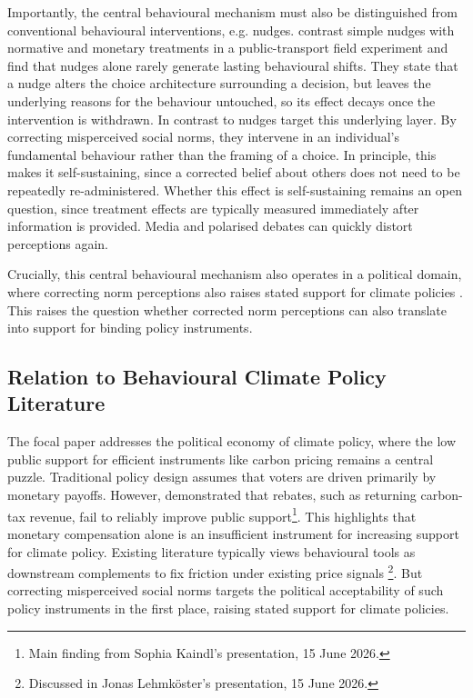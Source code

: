 \documentclass[11pt,a4paper]{scrartcl}
\numberwithin{equation}{section}
\theoremstyle{definition}
\theoremstyle{remark}
\begin{document}
    Importantly, the central behavioural mechanism \parencite[stated by][]{andre2024} must also be distinguished from conventional behavioural interventions, e.g. nudges. \textcite{gravert2021} contrast simple nudges with normative and monetary treatments in a public-transport field experiment and find that nudges alone rarely generate lasting behavioural shifts. They state that a nudge alters the choice architecture surrounding a decision, but leaves the underlying reasons for the behaviour untouched, so its effect decays once the intervention is withdrawn. In contrast to nudges \textcite{andre2024} target this underlying layer. By correcting misperceived social norms, they intervene in an individual's fundamental behaviour rather than the framing of a choice. In principle, this makes it self-sustaining, since a corrected belief about others does not need to be repeatedly re-administered. Whether this effect is self-sustaining remains an open question, since treatment effects are typically measured immediately after information is provided. Media and polarised debates can quickly distort perceptions again.

    Crucially, this central behavioural mechanism also operates in a political domain, where correcting norm perceptions also raises stated support for climate policies \parencite{andre2024}. This raises the question whether corrected norm perceptions can also translate into support for binding policy instruments.
    
\subsection{Relation to Behavioural Climate Policy Literature}
\label{subsec:Relation to Behavioural Climate Policy Literature}

    The focal paper addresses the political economy of climate policy, where the low public support for efficient instruments like carbon pricing remains a central puzzle. Traditional policy design assumes that voters are driven primarily by monetary payoffs. However, \textcite{Mildenberger2022} demonstrated that rebates, such as returning carbon-tax revenue, fail to reliably improve public support\footnote{Main finding from Sophia Kaindl's presentation, 15 June 2026.}. This highlights that monetary compensation alone is an insufficient instrument for increasing support for climate policy. Existing literature typically views behavioural tools as downstream complements to fix friction under existing price signals \parencite{gravert2022}\footnote{Discussed in Jonas Lehmköster's presentation, 15 June 2026.}. But correcting misperceived social norms targets the political acceptability of such policy instruments in the first place, raising stated support for climate policies.
\end{document}
